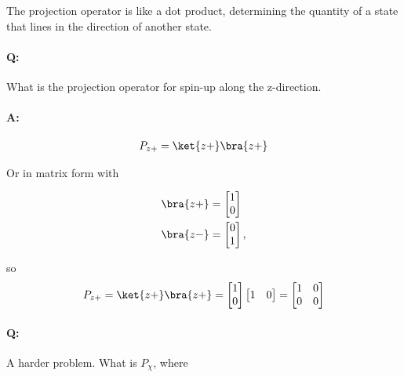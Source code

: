 The projection operator is like a dot product, determining the quantity of a state that lines in the direction of another state.

\paragraph{Q:} What is the projection operator for spin-up along the z-direction.
\paragraph{A:}

\begin{equation}\label{eqn:PHY356HNov2:100}
\begin{aligned}
P_{z+} = \ket{z+}\bra{z+}
\end{aligned}
\end{equation}

Or in matrix form with

\begin{equation}\label{eqn:PHY356HNov2:105}
\begin{aligned}
\bra{z+} &=
\begin{bmatrix}
1 \\
0
\end{bmatrix} \\
\bra{z-} &=
\begin{bmatrix}
0 \\
1
\end{bmatrix},
\end{aligned}
\end{equation}

so
\begin{equation}\label{eqn:PHY356HNov2:110}
\begin{aligned}
P_{z+} = \ket{z+}\bra{z+} =
\begin{bmatrix}
1 \\
0
\end{bmatrix}
\begin{bmatrix}
1 & 0
\end{bmatrix}
=
\begin{bmatrix}
1 & 0 \\
0 & 0
\end{bmatrix}
\end{aligned}
\end{equation}

\paragraph{Q:} A harder problem.  What is $P_\chi$, where

